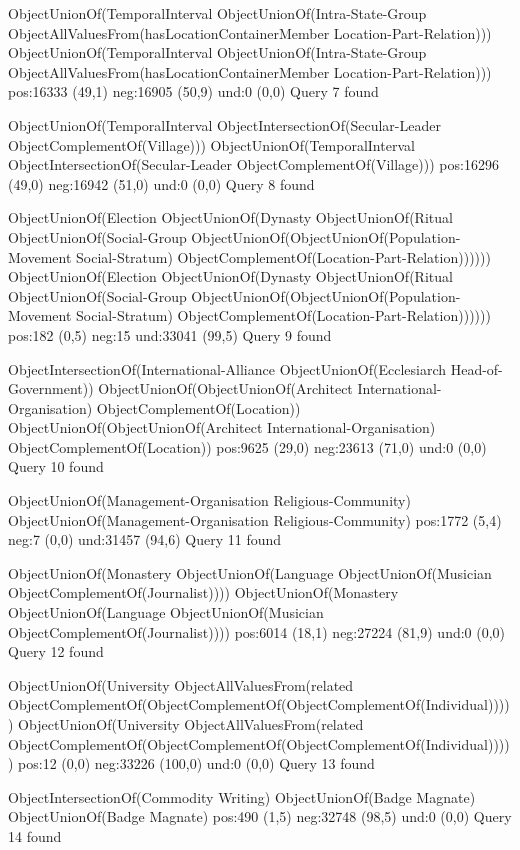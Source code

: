 ObjectUnionOf(TemporalInterval ObjectUnionOf(Intra-State-Group ObjectAllValuesFrom(hasLocationContainerMember Location-Part-Relation)))
ObjectUnionOf(TemporalInterval ObjectUnionOf(Intra-State-Group ObjectAllValuesFrom(hasLocationContainerMember Location-Part-Relation)))
pos:16333 (49,1)		 neg:16905 (50,9)		 und:0 (0,0)
Query 7 found

ObjectUnionOf(TemporalInterval ObjectIntersectionOf(Secular-Leader ObjectComplementOf(Village)))
ObjectUnionOf(TemporalInterval ObjectIntersectionOf(Secular-Leader ObjectComplementOf(Village)))
pos:16296 (49,0)		 neg:16942 (51,0)		 und:0 (0,0)
Query 8 found

ObjectUnionOf(Election ObjectUnionOf(Dynasty ObjectUnionOf(Ritual ObjectUnionOf(Social-Group ObjectUnionOf(ObjectUnionOf(Population-Movement Social-Stratum) ObjectComplementOf(Location-Part-Relation))))))
ObjectUnionOf(Election ObjectUnionOf(Dynasty ObjectUnionOf(Ritual ObjectUnionOf(Social-Group ObjectUnionOf(ObjectUnionOf(Population-Movement Social-Stratum) ObjectComplementOf(Location-Part-Relation))))))
pos:182 (0,5)		 neg:15		 und:33041 (99,5)
Query 9 found

ObjectIntersectionOf(International-Alliance ObjectUnionOf(Ecclesiarch Head-of-Government))
ObjectUnionOf(ObjectUnionOf(Architect International-Organisation) ObjectComplementOf(Location))
ObjectUnionOf(ObjectUnionOf(Architect International-Organisation) ObjectComplementOf(Location))
pos:9625 (29,0)		 neg:23613 (71,0)		 und:0 (0,0)
Query 10 found

ObjectUnionOf(Management-Organisation Religious-Community)
ObjectUnionOf(Management-Organisation Religious-Community)
pos:1772 (5,4)   	 neg:7 (0,0)		 und:31457 (94,6)
Query 11 found

ObjectUnionOf(Monastery ObjectUnionOf(Language ObjectUnionOf(Musician ObjectComplementOf(Journalist))))
ObjectUnionOf(Monastery ObjectUnionOf(Language ObjectUnionOf(Musician ObjectComplementOf(Journalist))))
pos:6014 (18,1)		 neg:27224 (81,9)		 und:0 (0,0)
Query 12 found

ObjectUnionOf(University ObjectAllValuesFrom(related ObjectComplementOf(ObjectComplementOf(ObjectComplementOf(Individual)))))
ObjectUnionOf(University ObjectAllValuesFrom(related ObjectComplementOf(ObjectComplementOf(ObjectComplementOf(Individual)))))
pos:12 (0,0)		 neg:33226 (100,0)		 und:0 (0,0)
Query 13 found

ObjectIntersectionOf(Commodity Writing)
ObjectUnionOf(Badge Magnate)
ObjectUnionOf(Badge Magnate)
pos:490 (1,5)		 neg:32748 (98,5)		 und:0 (0,0)
Query 14 found
